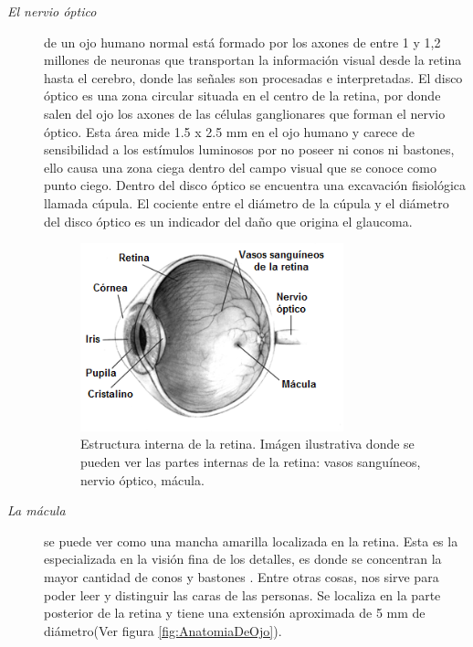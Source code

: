 \begin{description}
\item [\normalfont\textit{El nervio \'optico}] de un ojo humano normal est\'a formado por los axones de entre 1 y 1,2 millones de neuronas que transportan la informaci\'on visual desde la retina hasta el cerebro, donde las señales son procesadas e interpretadas. 
El disco \'optico es una zona circular situada en el centro de la retina, por donde salen del ojo los axones de las c\'elulas ganglionares que forman el nervio \'optico. Esta \'area mide 1.5 x 2.5 mm en el ojo humano y carece de sensibilidad a los est\'imulos luminosos por no poseer ni conos ni bastones, ello causa una zona ciega dentro del campo visual que se conoce como punto ciego. Dentro del disco \'optico se encuentra una excavaci\'on fisiol\'ogica llamada c\'upula. El cociente entre el di\'ametro de la c\'upula y el di\'ametro del disco \'optico es un indicador del daño que origina el glaucoma.\cite{li2004automated} \cite{hoover2003locating}
\begin{figure}[H]
	{
	\centering
	\includegraphics[width=0.75\textwidth]{Figures/retinaInterna}
	\caption[Estructura interna de la retina]{Estructura interna de la retina. Im\'agen ilustrativa donde se pueden ver las partes internas de la retina: vasos sangu\'ineos, nervio \'optico, m\'acula.}
	\label{fig:EstrucInternaRetina}
	}
\end{figure}	
\item [\normalfont\textit{La m\'acula}] se puede ver como una mancha amarilla localizada en la retina. Esta es la especializada en la visi\'on fina de los detalles, es donde se concentran la mayor cantidad de conos y bastones \cite{li2004automated} \cite{ibanez1999bayesian} \cite{sinthanayothin1999automated}. Entre otras cosas, nos sirve para poder leer y distinguir las caras de las personas. Se localiza en la parte posterior de la retina y tiene una extensi\'on aproximada de 5 mm de di\'ametro(Ver figura \ref{fig:AnatomiaDeOjo}).

\end{description}
